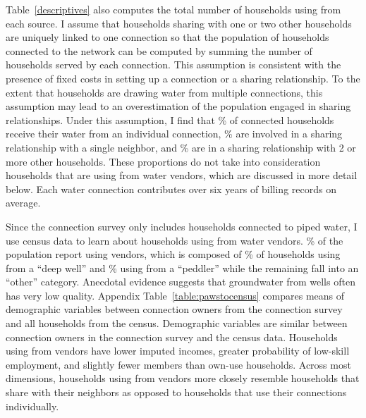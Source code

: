 \documentclass[12pt]{article}
\begin{document}
Table~\ref{descriptives} also computes the total number of households using from each source.  I assume that households sharing with one or two other households are uniquely linked to one connection so that the population of households connected to the network can be computed by summing the number of households served by each connection.  This assumption is consistent with the presence of fixed costs in setting up a connection or a sharing relationship.  To the extent that households are drawing water from multiple connections, this assumption may lead to an overestimation of the population engaged in sharing relationships.  Under this assumption, I find that \unskip\% of connected households receive their water from an individual connection, \unskip\% are involved in a sharing relationship with a single neighbor, and \unskip\% are in a sharing relationship with 2 or more other households.  These proportions do not take into consideration households that are using from water vendors, which are discussed in more detail below.  Each water connection contributes over six years of billing records on average.

Since the connection survey only includes households connected to piped water, I use census data to learn about households using from water vendors.  \unskip\% of the population report using vendors, which is composed of \unskip\% of households using from a ``deep well'' and \unskip\% using from a ``peddler'' while the remaining fall into an ``other'' category.  Anecdotal evidence suggests that groundwater from wells often has very low quality.  Appendix Table~\ref{table:pawstocensus} compares means of demographic variables between connection owners from the connection survey and all households from the census.  Demographic variables are similar between connection owners in the connection survey and the census data.  Households using from vendors have lower imputed incomes, greater probability of low-skill employment, and slightly fewer members than own-use households.  Across most dimensions, households using from vendors more closely resemble households that share with their neighbors as opposed to households that use their connections individually.
\end{document}

